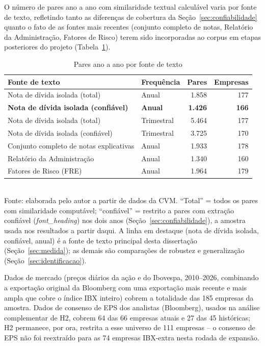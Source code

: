 \documentclass[a4paper,12pt]{report}
\begin{document}
O número de pares ano a ano com similaridade textual calculável varia por fonte de texto, refletindo tanto as diferenças de cobertura da Seção~\ref{sec:confiabilidade} quanto o fato de as fontes mais recentes (conjunto completo de notas, Relatório da Administração, Fatores de Risco) terem sido incorporadas ao corpus em etapas posteriores do projeto (Tabela~\ref{tab:sample}).

\begin{table}[htbp]
    \centering
    \caption{Pares ano a ano por fonte de texto}
    \label{tab:sample}
    \begin{tabular}{@{}llrr@{}}
        \toprule
        \textbf{Fonte de texto} & \textbf{Frequência} & \textbf{Pares} & \textbf{Empresas} \\
        \midrule
        Nota de dívida isolada (total)      & Anual & 1.858 & 177 \\
        \rowcolor{fontechave}
        \textbf{Nota de dívida isolada (confiável)}  & \textbf{Anual} & \textbf{1.426} & \textbf{166} \\
        Nota de dívida isolada (total)      & Trimestral & 5.464 & 177 \\
        Nota de dívida isolada (confiável)  & Trimestral & 3.725 & 170 \\
        Conjunto completo de notas explicativas & Anual & 1.933 & 178 \\
        Relatório da Administração & Anual & 1.340 & 160 \\
        Fatores de Risco (FRE) & Anual & 1.964 & 179 \\
        \bottomrule
    \end{tabular}
    \\[0.3cm]
    {\footnotesize Fonte: elaborada pelo autor a partir de dados da CVM. ``Total'' = todos os pares com similaridade computável; ``confiável'' = restrito a pares com extração confiável (\textit{font\_heading}) nos dois anos (Seção~\ref{sec:confiabilidade}), a amostra usada nos resultados a partir daqui. A linha em destaque (nota de dívida isolada, confiável, anual) é a fonte de texto principal desta dissertação (Seção~\ref{sec:medida}); as demais são comparações de robustez e generalização (Seção~\ref{sec:identificacao}).}
\end{table}

Dados de mercado (preços diários da ação e do Ibovespa, 2010--2026, combinando a exportação original da Bloomberg com uma exportação mais recente e mais ampla que cobre o índice IBX inteiro) cobrem a totalidade das 185 empresas da amostra. Dados de consenso de EPS dos analistas (Bloomberg), usados na análise complementar de H2, cobrem 64 das 66 empresas atuais e 27 das 45 históricas; H2 permanece, por ora, restrita a esse universo de 111 empresas -- o consenso de EPS não foi reextraído para as 74 empresas IBX-extra nesta rodada de expansão.
\end{document}
